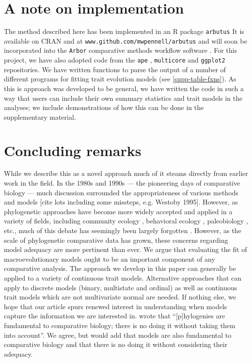 \documentclass[12pt]{article}
\begin{document}

\section{A note on implementation}

The method described here has been implemented in an R package \texttt{arbutus} It is available on CRAN and at \texttt{www.github.com/mwpennell/arbutus} and will soon be incorporated into the \texttt{Arbor} comparative methods workflow software \citep{Arbor}. For this project, we have also adopted code from the \texttt{ape} \citep{ape}, \texttt{multicore} \citep{multicore} and \texttt{ggplot2} \citep{ggplot2} repositories. We have written functions to parse the output of a number of different programs for fitting trait evolution models (see \ref{supp-table-fxns}). As this is approach was developed to be general, we have written the code in such a way that users can include their own summary statistics and trait models in the analyses; we include demonstrations of how this can be done in the supplementary material. 

\section{Concluding remarks}

While we describe this as a novel approach much of it steams directly from earlier work in the field. In the 1980s and 1990s --- the pioneering days of comparative biology --- much discussion surrounded the appropriateness of various methods and models [cite lots including some missteps, e.g. Westoby 1995]. However, as phylogenetic approaches have become more widely accepted and applied in a variety of fields, including community ecology \citep{Green1993, AckerlyDonoghue1995, Webb2002, CB2009, PennellHarmon}, behavioral ecology \citep{something}, paleobiology \citep{something else}, etc., much of this debate has seemingly been largely forgotten \citep[but see][]{Losos2010}. However, as the scale of phylogenetic comparative data has grown, these concerns regarding model adequacy are more pertinent than ever. We argue that evaluating the fit of macroevolutionary models ought to be an important component of any comparative analysis. The approach we develop in this paper can generally be applied to a variety of continuous trait models. Alternative approaches that can apply to discrete models (binary, multistate and ordinal) as well as continuous trait models which are not multivariate normal are needed. If nothing else, we hope that our article spurs renewed interest in understanding when models capture the information we are interested in. \citet[][p. 14]{Felsenstein1985} wrote that ``[p]hylogenies are fundamental to comparative biology; there is no doing it without taking them into account''. We agree, but would add that models are also fundamental to comparative biology and that there is no doing it without considering their adequacy.
\end{document}
